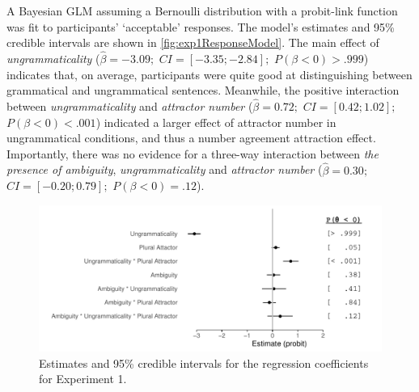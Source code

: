 \documentclass[doc,a4paper,man,natbib,floatsintext,noextraspace]{apa6}\usepackage[]{graphicx}\usepackage[]{color}
\makeatletter
\def\maxwidth{ %
  \ifdim\Gin@nat@width>\linewidth
    \linewidth
  \else
    \Gin@nat@width
  \fi
}
\newenvironment{knitrout}{}{} %
\makeatother
\begin{document}
A Bayesian GLM assuming a Bernoulli distribution with a probit-link function was fit to participants' `acceptable' responses. The model's estimates and 95\% credible intervals are shown in \autoref{fig:exp1ResponseModel}. 
%
%
The main effect of \textit{ungrammaticality} ($\hat{\beta}=-3.09;$ $CI=[-3.35; -2.84];$ $P(\beta<0)> .999$) indicates that, on average, participants were quite good at distinguishing between grammatical and ungrammatical sentences. Meanwhile, the positive interaction between \textit{ungrammaticality} and \textit{attractor number} ($\hat{\beta}=0.72;$ $CI=[0.42; 1.02];$ $P(\beta<0)< .001$) indicated a larger effect of attractor number in ungrammatical conditions, and thus a number agreement attraction effect.
Importantly, there was no evidence for a three-way interaction between \textit{the presence of ambiguity}, \textit{ungrammaticality} and \textit{attractor number} ($\hat{\beta}=0.30;$ $CI=[-0.20; 0.79];$ $P(\beta<0)=    .12$).



\begin{knitrout}
\color{fgcolor}\begin{figure}

{\centering \includegraphics[width=\maxwidth]{figure/exp1ResponseModel-1} 

}

\caption[Estimates and 95\% credible intervals for the regression coefficients for Experiment 1]{Estimates and 95\% credible intervals for the regression coefficients for Experiment 1.}\label{fig:exp1ResponseModel}
\end{figure}


\end{knitrout}
\end{document}
